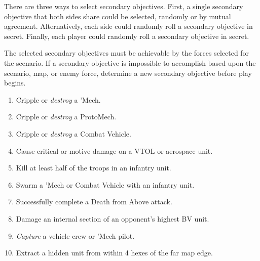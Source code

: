 There are three ways to select secondary objectives.
First, a single secondary objective that both sides share could be selected, randomly or by mutual agreement.
Alternatively, each side could randomly roll a secondary objective in secret.
Finally, each player could randomly roll a secondary objective in secret.

The selected secondary objectives must be achievable by the forces selected for the scenario.
If a secondary objective is impossible to accomplish based upon the scenario, map, or enemy force, determine a new secondary objective before play begins.

\begin{enumerate}

\item Cripple or \emph{destroy} a 'Mech.

\item Cripple or \emph{destroy} a ProtoMech.

\item Cripple or \emph{destroy} a Combat Vehicle.

\item Cause critical or motive damage on a VTOL or aerospace unit.

\item Kill at least half of the troops in an infantry unit.

\item Swarm a 'Mech or Combat Vehicle with an infantry unit.

\item Successfully complete a Death from Above attack.

\item Damage an internal section of an opponent's highest BV unit.

\item \emph{Capture} a vehicle crew or 'Mech pilot.

\item Extract a hidden unit from within 4 hexes of the far map edge.

\end{enumerate}
